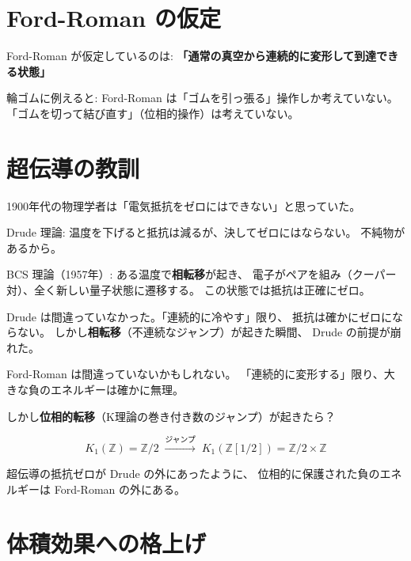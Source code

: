\documentclass[12pt,a4paper]{article}
\begin{document}
\section{Ford-Roman の仮定}

\begin{resultbox}[見落とされた仮定]
Ford-Roman が仮定しているのは:
\textbf{「通常の真空から連続的に変形して到達できる状態」}

輪ゴムに例えると:
Ford-Roman は「ゴムを引っ張る」操作しか考えていない。
「ゴムを切って結び直す」（位相的操作）は考えていない。
\end{resultbox}

\section{超伝導の教訓}

\begin{storybox}
1900年代の物理学者は「電気抵抗をゼロにはできない」と思っていた。

Drude 理論: 温度を下げると抵抗は減るが、決してゼロにはならない。
不純物があるから。

BCS 理論（1957年）: ある温度で\textbf{相転移}が起き、
電子がペアを組み（クーパー対）、全く新しい量子状態に遷移する。
この状態では抵抗は正確にゼロ。

Drude は間違っていなかった。「連続的に冷やす」限り、
抵抗は確かにゼロにならない。
しかし\textbf{相転移}（不連続なジャンプ）が起きた瞬間、
Drude の前提が崩れた。
\end{storybox}

\begin{resultbox}[同じ構造]
Ford-Roman は間違っていないかもしれない。
「連続的に変形する」限り、大きな負のエネルギーは確かに無理。

しかし\textbf{位相的転移}（K理論の巻き付き数のジャンプ）が起きたら？

$$K_1(\mathbb{Z}) = \mathbb{Z}/2 \;\xrightarrow{\text{ジャンプ}}\; K_1(\mathbb{Z}[1/2]) = \mathbb{Z}/2 \times \mathbb{Z}$$

超伝導の抵抗ゼロが Drude の外にあったように、
位相的に保護された負のエネルギーは Ford-Roman の外にある。
\end{resultbox}

\section{体積効果への格上げ}
\end{document}
